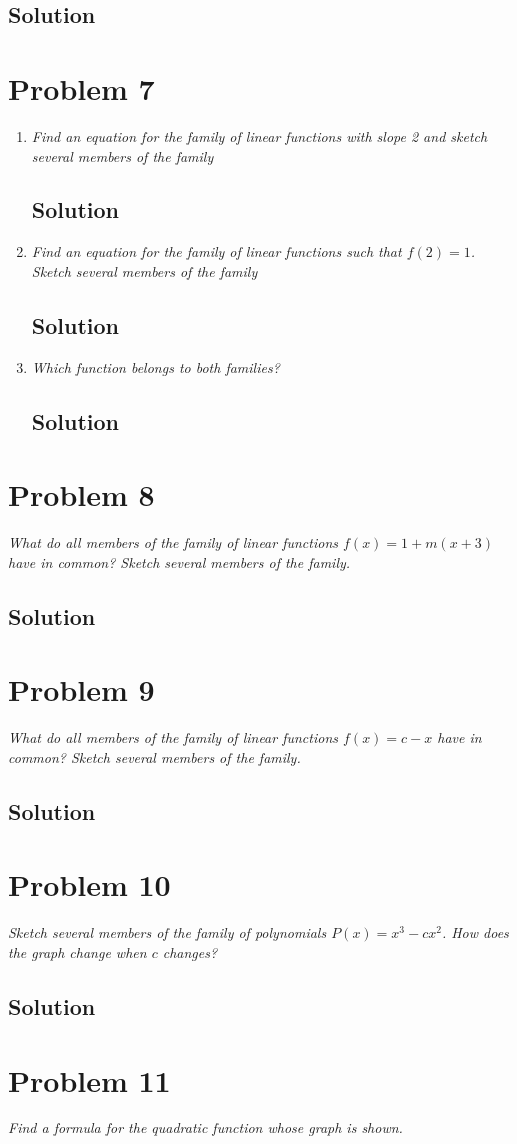 \documentclass[11pt]{article}
\newcommand{\soln}{\subsection*}
\newcommand{\qn}{\textit}
\begin{document}
\soln{Solution}

\section*{Problem 7}

\begin{enumerate}
	\item \qn{Find an equation for the family of linear functions with slope 2 and sketch several members of the family}
	\soln{Solution}
	
	\item \qn{Find an equation for the family of linear functions such that $f(2)=1$. Sketch several members of the family}
	\soln{Solution}
	
	\item \qn{Which function belongs to both families?}
	\soln{Solution}
\end{enumerate}

\section*{Problem 8}

\qn{What do all members of the family of linear functions $f(x)=1+m(x+3)$ have in common? Sketch several members of the family.}

\soln{Solution}

\section*{Problem 9}

\qn{What do all members of the family of linear functions $f(x)=c-x$ have in common? Sketch several members of the family.}

\soln{Solution}

\section*{Problem 10}

\qn{Sketch several members of the family of polynomials $P(x)=x^3-cx^2$. How does the graph change when $c$ changes?}

\soln{Solution}

\section*{Problem 11}

\qn{Find a formula for the quadratic function whose graph is shown.}
\end{document}
